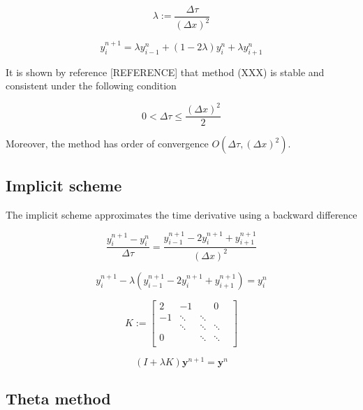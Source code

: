 \begin{equation}
  \lambda := \frac{\Delta \tau}{(\Delta x)^2}
\end{equation}

\begin{equation}
  y^{n+1}_i = \lambda y^{n}_{i-1} + (1 - 2\lambda)y^{n}_{i} + \lambda y^{n}_{i+1}
\end{equation}

It is shown by reference [REFERENCE] that method (XXX) is stable and consistent 
under the following condition

\begin{equation}
  0 < \Delta \tau \le \frac{(\Delta x)^2}{2}
\end{equation}

Moreover, the method has order of convergence $O(\Delta \tau, (\Delta x)^{2})$.

\subsection{Implicit scheme}

The implicit scheme approximates the time derivative using a backward difference

\begin{equation}
  \frac{y^{n+1}_{i} - y^{n}_{i}}{\Delta \tau} = \frac{y^{n+1}_{i-1} - 2y^{n+1}_{i} + y^{n+1}_{i+1}}{(\Delta x)^2}
\end{equation}

\begin{equation}
  y^{n+1}_{i} - \lambda (y^{n+1}_{i-1} - 2y^{n+1}_{i} + y^{n+1}_{i+1}) = y^{n}_{i}  
\end{equation}

\begin{equation}
  K := \begin{bmatrix}
    2 & -1     & & 0 \\ 
   -1 & \ddots & \ddots \\
      & \ddots & \ddots & \ddots \\
    0 & & \ddots & \ddots & \\
  \end{bmatrix} 
\end{equation}

\begin{equation}
  (I + \lambda K)\boldsymbol{y}^{n+1} = \boldsymbol{y}^{n}
\end{equation}

\subsection{Theta method}

